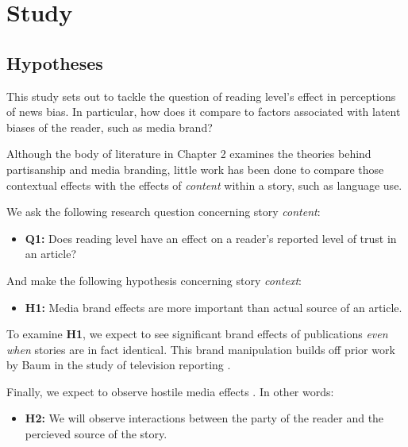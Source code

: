 \chapter{Study}

\section{Hypotheses}
 
This study sets out to tackle the question of reading level's effect in perceptions of news bias. In particular, how does it compare to factors associated with latent biases of the reader, such as media brand?

Although the body of literature in Chapter 2 examines the theories behind partisanship and media branding, little work has been done to compare those contextual effects with the effects of \emph{content} within a story, such as language use.

We ask the following research question concerning story \emph{content}:

\begin{itemize}
\item \textbf{Q1:} Does reading level have an effect on a reader's reported level of trust in an article?
\end{itemize}

And make the following hypothesis concerning story \emph{context}:

\begin{itemize}
\item \textbf{H1:} Media brand effects are more important than actual source of an article. 
\end{itemize}

To examine \textbf{H1}, we expect to see significant brand effects of publications \emph{even when} stories are in fact identical. This brand manipulation builds off prior work by Baum in the study of television reporting \cite{baum2008eye}.

Finally, we expect to observe hostile media effects \cite{vallone1985hostile}. In other words:

\begin{itemize}
\item \textbf{H2:} We will observe interactions between the party of the reader and the percieved source of the story.
\end{itemize}





